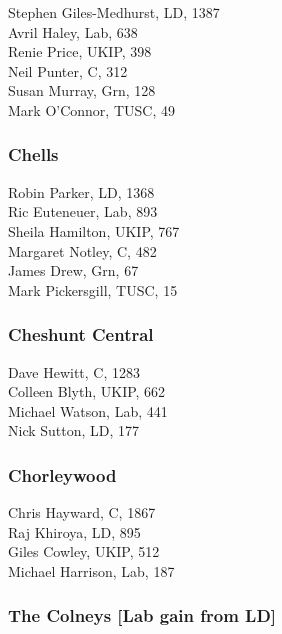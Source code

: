 \documentclass[a4paper,openany,10pt]{book}
\begin{document}


{Stephen Giles-Medhurst}, LD, 1387\\
Avril Haley, Lab, 638\\
Renie Price, UKIP, 398\\
Neil Punter, C, 312\\
Susan Murray, Grn, 128\\
Mark O'Connor, TUSC, 49\\


\subsubsection*{Chells}



Robin Parker, LD, 1368\\
Ric Euteneuer, Lab, 893\\
Sheila Hamilton, UKIP, 767\\
Margaret Notley, C, 482\\
James Drew, Grn, 67\\
Mark Pickersgill, TUSC, 15\\


\subsubsection*{Cheshunt Central}



Dave Hewitt, C, 1283\\
Colleen Blyth, UKIP, 662\\
Michael Watson, Lab, 441\\
Nick Sutton, LD, 177\\


\subsubsection*{Chorleywood}



Chris Hayward, C, 1867\\
Raj Khiroya, LD, 895\\
Giles Cowley, UKIP, 512\\
Michael Harrison, Lab, 187\\


\subsubsection*{The Colneys \hspace*{\fill}\nolinebreak[1]%
\enspace\hspace*{\fill}
[Lab gain from LD]}
\end{document}
